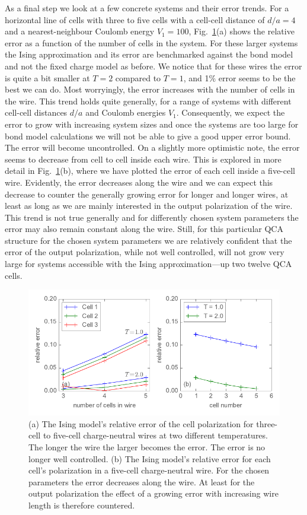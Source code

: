 As a final step we look at a few concrete systems and their error trends. For a
horizontal line of cells with three to five cells with a cell-cell distance of
$d/a = 4$ and a nearest-neighbour Coulomb energy $V_1 = 100$,
Fig.~\ref{fig:ising_approximation3}(a) shows the relative error as a function of
the number of cells in the system. For these larger systems the Ising
approximation and its error are benchmarked against the bond model and not the
fixed charge model as before. We notice that for these wires the error is quite
a bit smaller at $T = 2$ compared to $T = 1$, and 1\% error seems to be the best
we can do. Most worryingly, the error increases with the number of cells in the
wire. This trend holds quite generally, for a range of systems with different
cell-cell distances $d/a$ and Coulomb energies $V_1$. Consequently, we expect
the error to grow with increasing system sizes and once the systems are too
large for bond model calculations we will not be able to give a good upper error
bound. The error will become uncontrolled. On a slightly more optimistic note,
the error seems to decrease from cell to cell inside each wire. This is explored
in more detail in Fig.~\ref{fig:ising_approximation3}(b), where we have plotted
the error of each cell inside a five-cell wire. Evidently, the error decreases
along the wire and we can expect this decrease to counter the generally growing
error for longer and longer wires, at least as long as we are mainly interested
in the output polarization of the wire. This trend is not true generally and for
differently chosen system parameters the error may also remain constant along
the wire. Still, for this particular QCA structure for the chosen system
parameters we are relatively confident that the error of the output
polarization, while not well controlled, will not grow very large for systems
accessible with the Ising approximation---up two twelve QCA cells. 
%
\begin{figure}
  \center
  \includegraphics{ising_approximation3}
  \caption{
  (a) The Ising model's relative error of the cell polarization for three-cell
  to five-cell charge-neutral wires at two different temperatures. The longer
  the wire the larger becomes the error. The error is no longer well controlled.
  (b) The Ising model's relative error for each cell's polarization in a
  five-cell charge-neutral wire. For the chosen parameters the error decreases
  along the wire. At least for the output polarization the effect of a growing
  error with increasing wire length is therefore countered.
  }
  \label{fig:ising_approximation3}
\end{figure}
